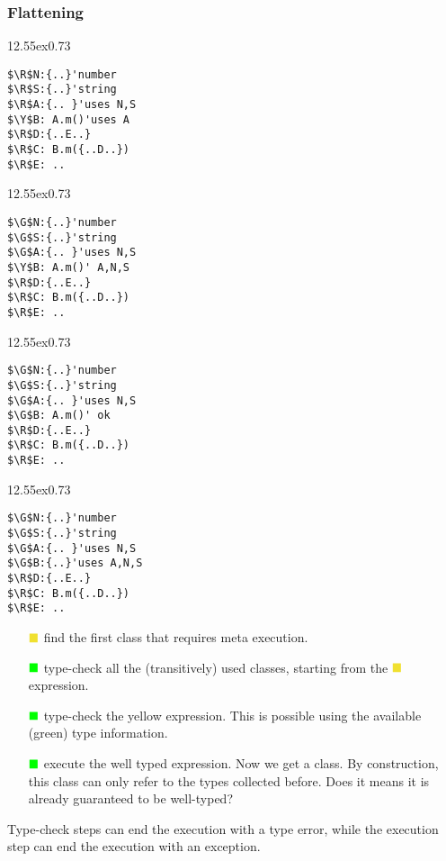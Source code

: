 \newcommand\mini{\begin{NiceCode}{12.55ex}{0.73}}
\newcommand\G{\color{green}{\blacksquare}}
\newcommand\R{\color{red}{\blacksquare}}
\newcommand\Y{\color{darkYellow}{\blacksquare}}
\newcommand\GG{\color{black}{\blacksquare}}
\begin{frame}[fragile]
\frametitle{Flattening}
\mini
\begin{lstlisting}
$\R$N:{..}'number
$\R$S:{..}'string
$\R$A:{.. }'uses N,S
$\Y$B: A.m()'uses A
$\R$D:{..E..}
$\R$C: B.m({..D..})
$\R$E: ..
\end{lstlisting}
\end{NiceCode}
\mini
\begin{lstlisting}
$\G$N:{..}'number
$\G$S:{..}'string
$\G$A:{.. }'uses N,S
$\Y$B: A.m()' A,N,S
$\R$D:{..E..}
$\R$C: B.m({..D..})
$\R$E: ..
\end{lstlisting}
\end{NiceCode}
\mini
\begin{lstlisting}
$\G$N:{..}'number
$\G$S:{..}'string
$\G$A:{.. }'uses N,S
$\G$B: A.m()' ok
$\R$D:{..E..}
$\R$C: B.m({..D..})
$\R$E: ..
\end{lstlisting}
\end{NiceCode}
\mini
\begin{lstlisting}
$\G$N:{..}'number
$\G$S:{..}'string
$\G$A:{.. }'uses N,S
$\G$B:{..}'uses A,N,S
$\R$D:{..E..}
$\R$C: B.m({..D..})
$\R$E: ..
\end{lstlisting}
\end{NiceCode}
\small
\begin{itemize}
\item[$\Y$]
find the first class that requires meta execution.
\item[$\G$]
type-check all the (transitively) used classes, starting from the $\Y$ expression.
\item[$\G$]
type-check the yellow expression. This is possible using the available (green) type information.
\item[$\G$]
execute the well typed expression. Now we get a class.
By construction, this class can only refer to the types collected before.
Does it means it is already guaranteed to be well-typed?
\end{itemize}
Type-check steps can end the execution with a type error,
while the execution step can end the execution with an exception.

\end{frame}




